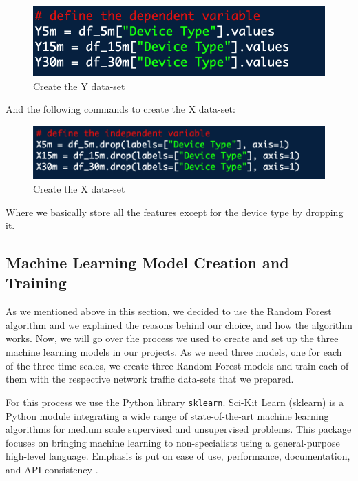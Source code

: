 \documentclass{article}
\begin{document}
\begin{figure}[!ht]
    \centering
    \includegraphics[width=13cm]{MLgraphs/splitxandy.png}
    \caption{Create the Y data-set} 
\end{figure}

And the following commands to create the X data-set:\newline

\begin{figure}[!ht]
    \centering
    \includegraphics[width=13cm]{MLgraphs/createxdataset.png}
    \caption{Create the X data-set} 
\end{figure}

Where we basically store all the features except for the device type by dropping it.\newline



\subsection{Machine Learning Model Creation and Training}

As we mentioned above in this section, we decided to use the Random Forest algorithm and we explained the reasons behind our choice, and how the algorithm works. Now, we will go over the process we used to create and set up the three machine learning models in our projects. As we need three models, one for each of the three time scales, we create three Random Forest models and train each of them with the respective network traffic data-sets that we prepared. \newline

For this process we use the Python library \texttt{sklearn}. Sci-Kit Learn (sklearn) is a Python module integrating a wide range of state-of-the-art machine learning algorithms for medium scale supervised and unsupervised problems. This package focuses on bringing machine learning to non-specialists using a general-purpose high-level language. Emphasis is put on ease of use, performance, documentation, and API consistency \cite{Scikit-learn}. \newline
\end{document}
